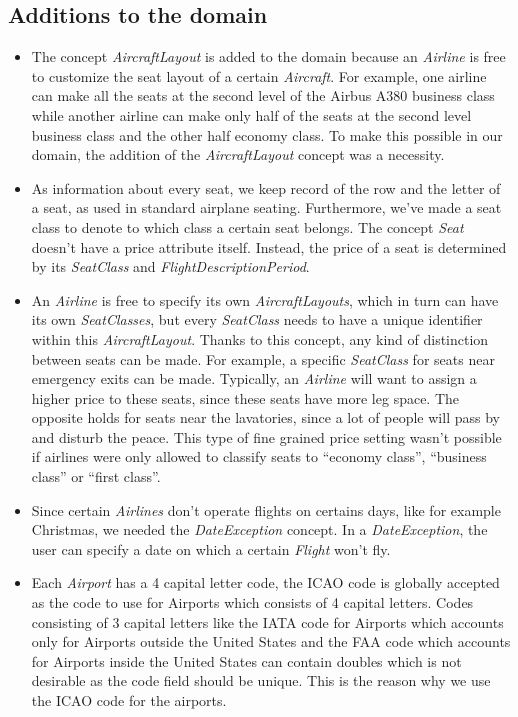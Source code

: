 \documentclass[a4paper,11pt]{article}
\newcommand{\dsltype}[1]{\textit{#1}}
\begin{document}
\subsection{Additions to the domain}
\begin{itemize}
\item The concept \dsltype{AircraftLayout} is added to the domain because an \dsltype{Airline} is free to customize the seat layout of a certain \dsltype{Aircraft}. For example, one airline can make all the seats at the second level of the Airbus A380 business class while another airline can make only half of the seats at the second level business class and the other half economy class. To make this possible in our domain, the addition of the \dsltype{AircraftLayout} concept was a necessity.

\item As information about every seat, we keep record of the row and the letter of a seat, as used in standard airplane seating. Furthermore, we’ve made a seat class to denote to which class a certain seat belongs. The concept \dsltype{Seat} doesn’t have a price attribute itself. Instead, the price of a seat is determined by its \dsltype{SeatClass} and \dsltype{FlightDescriptionPeriod}.

\item An \dsltype{Airline} is free to specify its own \dsltype{AircraftLayouts}, which in turn can have its own \dsltype{SeatClasses}, but every \dsltype{SeatClass} needs to have a unique identifier within this \dsltype{AircraftLayout}. Thanks to this concept, any kind of distinction between seats can be made. For example, a specific \dsltype{SeatClass} for seats near emergency exits can be made. Typically, an \dsltype{Airline} will want to assign a higher price to these seats, since these seats have more leg space. The opposite holds for seats near the lavatories, since a lot of people will pass by and disturb the peace. This type of fine grained price setting wasn’t possible if airlines were only allowed to classify seats to “economy class”, “business class” or “first class”.

\item Since certain \dsltype{Airlines} don’t operate flights on certains days, like for example Christmas, we needed the \dsltype{DateException} concept. In a \dsltype{DateException}, the user can specify a date on which a certain \dsltype{Flight} won’t fly.

\item Each \dsltype{Airport} has a 4 capital letter code, the ICAO \citep{icao_airport} code is globally accepted as the code to use for Airports which consists of 4 capital letters. Codes consisting of 3 capital letters like the IATA \citep{iata_airport} code for Airports which accounts only for Airports outside the United States and the FAA \citep{faa_airport} code which accounts for Airports inside the United States can contain doubles which is not desirable as the code field should be unique. This is the reason why we use the ICAO code for the airports.


\end{itemize}
\end{document}
